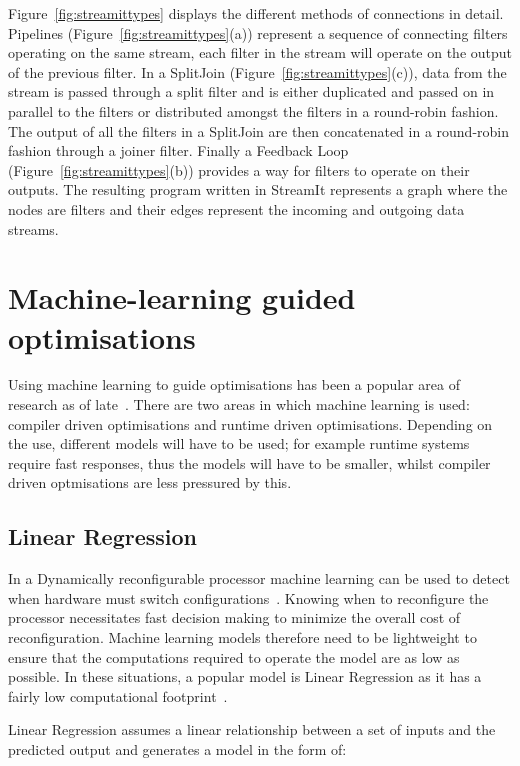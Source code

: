 Figure~\ref{fig:streamittypes} displays the different methods of connections in detail.
Pipelines (Figure~\ref{fig:streamittypes}(a)) represent a sequence of connecting filters operating on the same stream, each filter in the stream will operate on the output of the previous filter.
In a SplitJoin (Figure~\ref{fig:streamittypes}(c)), data from the stream is passed through a split filter and is either duplicated and passed on in parallel to the filters or distributed amongst the filters in a round-robin fashion.
The output of all the filters in a SplitJoin are then concatenated in a round-robin fashion through a joiner filter.
Finally a Feedback Loop (Figure~\ref{fig:streamittypes}(b)) provides a way for filters to operate on their outputs.
The resulting program written in StreamIt represents a graph where the nodes are filters and their edges represent the incoming and outgoing data streams.

\section{Machine-learning guided optimisations}

Using machine learning to guide optimisations has been a popular area of research as of late~\cite{cummins2017pact,wang2018ml,dubach13dynamic}.
There are two areas in which machine learning is used: compiler driven optimisations and runtime driven optimisations.
Depending on the use, different models will have to be used; for example runtime systems require fast responses, thus the models will have to be smaller, whilst compiler driven optmisations are less pressured by this.

\subsection{Linear Regression}

In a Dynamically reconfigurable processor machine learning can be used to detect when hardware must switch configurations~\cite{micolet2017cases, tavanaElastic}.
Knowing when to reconfigure the processor necessitates fast decision making to minimize the overall cost of reconfiguration.
Machine learning models therefore need to be lightweight to ensure that the computations required to operate the model are as low as possible.
In these situations, a popular model is Linear Regression as it has a fairly low computational footprint~\cite{tavanaElastic}.

Linear Regression assumes a linear relationship between a set of inputs and the predicted output and generates a model in the form of:

